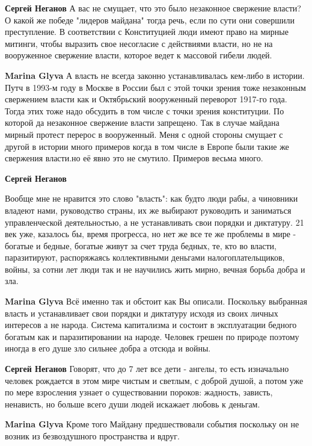 \begin{itemize}
\begin{itemize} %
\textbf{Сергей Неганов} А вас не смущает, что это было незаконное свержение власти? О какой же победе "лидеров майдана" тогда речь, если по сути они совершили преступление. В соответствии с Конституцией люди имеют право на мирные митинги, чтобы выразить свое несогласие с действиями власти, но не на вооруженное свержение власти, которое ведет к массовой гибели людей.

\textbf{Marina Glyva} А власть не всегда законно устанавливалась кем-либо в истории.
Путч в 1993-м году в Москве в России был с этой точки зрения тоже незаконным свержением власти как и Октябрьский вооруженный переворот 1917-го года.
Тогда этих тоже надо обсудить в том числе с точки зрения конституции.
По которой да незаконное свержение власти запрещено.
Так в случае майдана мирный протест перерос в вооруженный.
Меня с одной стороны смущает с другой в истории много примеров когда в том числе в Европе были такие же свержения власти.но её явно это не смутило.
Примеров весьма много.

\textbf{Сергей Неганов} 

Вообще мне не нравится это слово "власть": как будто люди рабы, а чиновники
владеют нами, руководство страны, их же выбирают руководить и заниматься
управленческой деятельностью, а не устанавливать свои порядки и диктатуру. 21
век уже, казалось бы, время прогресса, но нет же все те же проблемы в мире -
богатые и бедные, богатые живут за счет труда бедных, те, кто во власти,
паразитируют, распоряжаясь коллективными деньгами налогоплательщиков, войны, за
сотни лет люди так и не научились жить мирно, вечная борьба добра и зла.


\textbf{Marina Glyva} Всё именно так и обстоит как Вы описали.
Поскольку выбранная власть и устанавливает свои порядки и диктатуру исходя из своих личных интересов а не народа.
Система капитализма и состоит в эксплуатации бедного богатым как и паразитировании на народе.
Человек грешен по природе поэтому иногда в его душе зло сильнее добра а отсюда и войны.

\textbf{Сергей Неганов} Говорят, что до 7 лет все дети - ангелы, то есть изначально человек рождается в этом мире чистым и светлым, с доброй душой, а потом уже по мере взросления узнает о существовании пороков: жадность, зависть, ненависть, но больше всего души людей искажает любовь к деньгам.

\textbf{Marina Glyva} Кроме того Майдану предшествовали события поскольку он не возник из безвоздушного пространства и вдруг.


\end{itemize}
\end{itemize}
